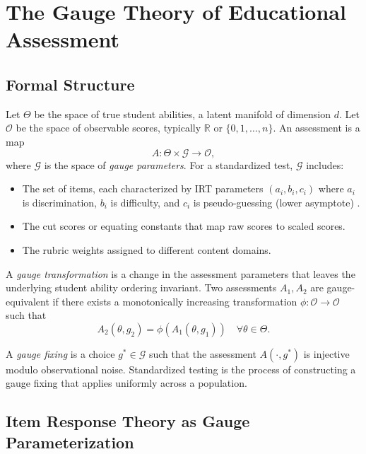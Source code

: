 \documentclass[12pt,a4paper]{article}
\theoremstyle{remark}
\newcommand{\R}{\mathbb{R}}
\newcommand{\G}{\mathcal{G}}
\newcommand{\Obs}{\mathcal{O}}
\begin{document}
\section{The Gauge Theory of Educational Assessment}

\subsection{Formal Structure}

Let $\Theta$ be the space of true student abilities, a latent manifold of dimension $d$. Let $\Obs$ be the space of observable scores, typically $\R$ or $\{0,1,\dots,n\}$. An assessment is a map
\begin{equation}
A: \Theta \times \G \to \Obs,
\label{eq:assessment}
\end{equation}
where $\G$ is the space of \emph{gauge parameters}. For a standardized test, $\G$ includes:
\begin{itemize}
    \item The set of items, each characterized by IRT parameters $(a_i, b_i, c_i)$ where $a_i$ is discrimination, $b_i$ is difficulty, and $c_i$ is pseudo-guessing (lower asymptote) \cite{baker2001}.
    \item The cut scores or equating constants that map raw scores to scaled scores.
    \item The rubric weights assigned to different content domains.
\end{itemize}

A \emph{gauge transformation} is a change in the assessment parameters that leaves the underlying student ability ordering invariant. Two assessments $A_1, A_2$ are gauge-equivalent if there exists a monotonically increasing transformation $\phi: \Obs \to \Obs$ such that
\begin{equation}
A_2(\theta, g_2) = \phi(A_1(\theta, g_1)) \quad \forall \theta \in \Theta.
\label{eq:gauge_equiv}
\end{equation}

A \emph{gauge fixing} is a choice $g^* \in \G$ such that the assessment $A(\cdot, g^*)$ is injective modulo observational noise. Standardized testing is the process of constructing a gauge fixing that applies uniformly across a population.

\subsection{Item Response Theory as Gauge Parameterization}
\end{document}
